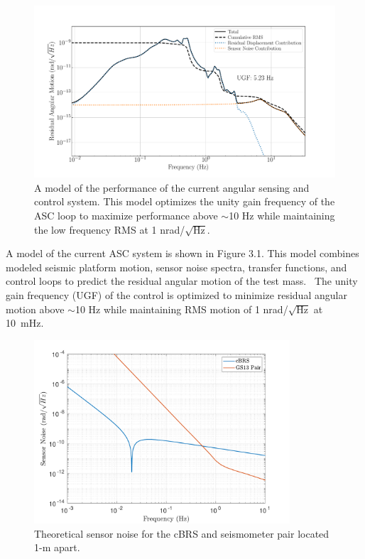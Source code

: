 \documentclass [12pt, proquest]{uwthesis}[2019]
\begin{document}
\begin{figure}[!h]
\begin{center}
\includegraphics[width=\textwidth]{cBRS_ASC_Without.pdf}
\caption[Model of the performance of the current angular sensing and control system]{A model of the performance of the current angular sensing and control system. This model optimizes the unity gain frequency of the ASC loop to maximize performance above $\sim$10 Hz while maintaining the low frequency RMS at 1 nrad/$\sqrt{\text{Hz}}$.}
\label{ascWithout}
\end{center}
\end{figure}

A model of the current ASC system is shown in Figure 3.1. This model combines modeled seismic platform motion, sensor noise spectra, transfer functions, and control loops to predict the residual angular motion of the test mass.~\cite{ascModel} The unity gain frequency (UGF) of the control is optimized to minimize residual angular motion above $\sim$10 Hz while maintaining RMS motion of 1 nrad/$\sqrt{\text{Hz}}$ at 10~mHz.

\begin{figure}[!h]
\begin{center}
\includegraphics[width=0.85\textwidth]{sensorNoise.pdf}
\caption[Theoretical sensor noise for the cBRS and seismometer pair]{Theoretical sensor noise for the cBRS and seismometer pair located 1-m apart.}
\label{sensNoise}
\end{center}
\end{figure}
\end{document}
